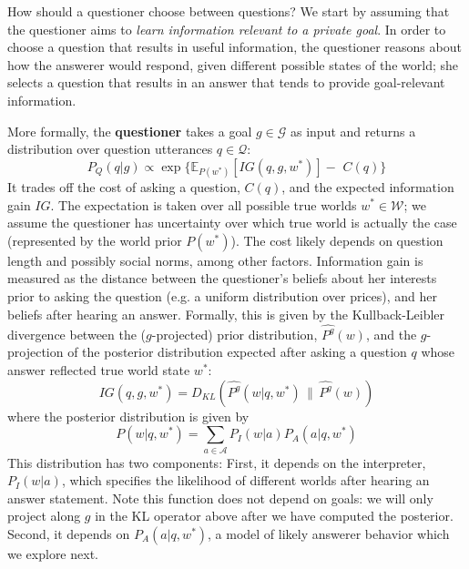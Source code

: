 \documentclass[12pt, floatsintext, jou]{apa6}
\begin{document}
How should a questioner choose between questions?
%
We start by assuming that the questioner aims to \emph{learn information relevant to a private goal}.
%
In order to choose a question that results in useful information, the questioner reasons about how the answerer would respond, given different possible states of the world; she selects a question that results in an answer that tends to provide goal-relevant information.
%




\newcommand{\KL}[2]{\ensuremath{D_{KL}({#1}\, \| \, {#2})}}
\newcommand{\E}[2]{\ensuremath{\mathbb{E}_{#1}\left [#2 \right]}}

More formally, the \textbf{questioner} takes a goal $g \in \mathcal{G}$ as input and returns a distribution over question utterances $q \in \mathcal{Q}$:
%
$$ 
P_{Q}(q|g)  \propto \exp\{\E{P(w^*)}{IG(q,g,w^*)} - \,\,C(q)\}
$$
%
It trades off the cost of asking a question, $C(q)$, and the expected information gain $IG$. The expectation is taken over all possible true worlds $w^* \in \mathcal{W}$; we assume the questioner has uncertainty over which true world is actually the case (represented by the world prior $P(w^*)$). The cost likely depends on question length and possibly social norms, among other factors. Information gain is measured as the distance between the questioner's beliefs about her interests prior to asking the question (e.g. a uniform distribution over prices), and her beliefs after hearing an answer. Formally, this is given by the Kullback-Leibler divergence between the ($g$-projected) prior distribution, $\widehat{P^g}(w)$, and the $g$-projection of the posterior distribution expected after asking a question $q$ whose answer reflected true world state $w^*$:
%
$$IG(q,g,w^*) = \KL{\widehat{P^g}(w|q, w^*)}{\widehat{P^g}(w)}$$
where the posterior distribution is given by
$$P(w|q, w^*) = \sum_{a \in \mathcal{A}} P_I(w | a) P_{A}(a| q, w^*)$$
%
This distribution has two components: 
First, it depends on the interpreter, $P_I(w | a)$, which specifies the likelihood of different worlds after hearing an answer statement. Note this function does not depend on goals: we will only project along $g$ in the KL operator above after we have computed the posterior. Second, it depends on $P_{A}(a | q, w^*)$, a model of likely answerer behavior which we explore next.
\end{document}
